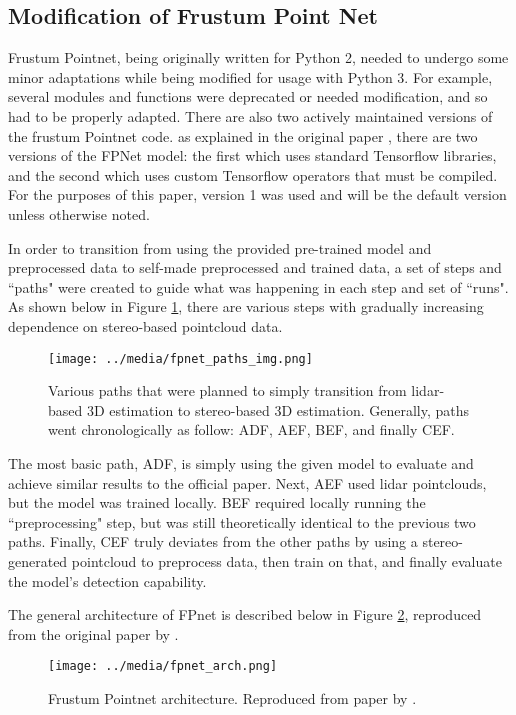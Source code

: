 \subsection{Modification of Frustum Point Net}
Frustum Pointnet, being originally written for Python 2, needed to undergo some minor adaptations while being modified for usage with Python 3. For example, several modules and functions were deprecated or needed modification, and so had to be properly adapted. There are also two actively maintained versions of the frustum Pointnet code. as explained in the original paper \cite{qi_frustum_2017}, there are two versions of the FPNet model: the first which uses standard Tensorflow libraries, and the second which uses custom Tensorflow operators that must be compiled. For the purposes of this paper, version 1 was used and will be the default version unless otherwise noted.

In order to transition from using the provided pre-trained model and preprocessed data to self-made preprocessed and trained data, a set of steps and ``paths" were created to guide what was happening in each step and set of ``runs". As shown below in Figure \ref{fp_paths}, there are various steps with gradually increasing dependence on stereo-based pointcloud data.

\begin{figure}[H]
    \centering
    \texttt{[image: ../media/fpnet\_paths\_img.png]}
    \caption{Various paths that were planned to simply transition from lidar-based 3D estimation to stereo-based 3D estimation. Generally, paths went chronologically as follow: ADF, AEF, BEF, and finally CEF.}
    \label{fp_paths}
\end{figure}

The most basic path, ADF, is simply using the given model to evaluate and achieve similar results to the official paper. Next, AEF used lidar pointclouds, but the model was trained locally. BEF required locally running the ``preprocessing" step, but was still theoretically identical to the previous two paths. Finally, CEF truly deviates from the other paths by using a stereo-generated pointcloud to preprocess data, then train on that, and finally evaluate the model's detection capability.

The general architecture of FPnet is described below in Figure \ref{fpnet_arch}, reproduced from the original paper by \cite{qi_frustum_2017}. 

\begin{figure}[H]
    \centering
    \texttt{[image: ../media/fpnet\_arch.png]}
    \caption{Frustum Pointnet architecture. Reproduced from paper by \cite{qi_frustum_2017}.}
    \label{fpnet_arch}
\end{figure}

